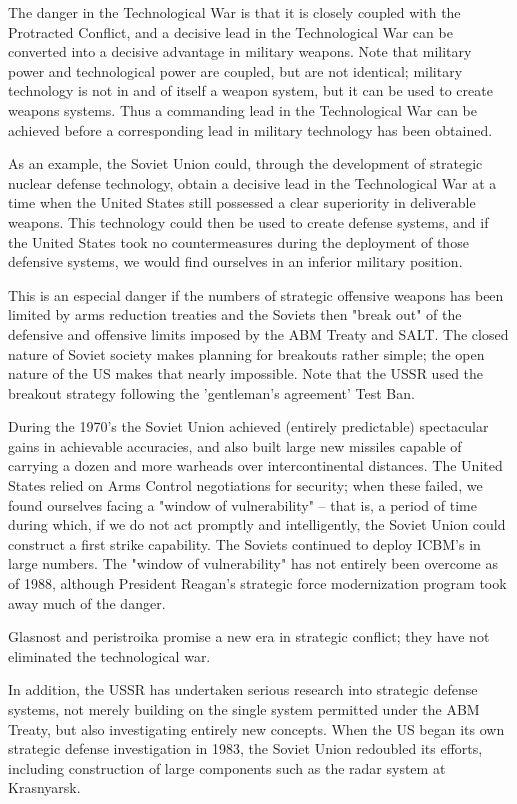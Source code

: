 The danger in the Technological War is that it is closely coupled with the Protracted Conflict, and a decisive lead in the Technological War can be converted into a decisive advantage in military weapons. Note that military power and technological power are coupled, but are not identical; military technology is not in and of itself a weapon system, but it can be used to create weapons systems. Thus a commanding lead in the Technological War can be achieved before a corresponding lead in military technology has been obtained.

As an example, the Soviet Union could, through the development of strategic nuclear defense technology, obtain a decisive lead in the Technological War at a time when the United States still possessed a clear superiority in deliverable weapons. This technology could then be used to create defense systems, and if the United States took no countermeasures during the deployment of those defensive systems, we would find ourselves in an inferior military position.

This is an especial danger if the numbers of strategic offensive weapons has been limited by arms reduction treaties and the Soviets then "break out" of the defensive and offensive limits imposed by the ABM Treaty and SALT. The closed nature of Soviet society makes planning for breakouts rather simple; the open nature of the US makes that nearly impossible. Note that the USSR used the breakout strategy following the 'gentleman's agreement' Test Ban.

During the 1970's the Soviet Union achieved (entirely predictable) spectacular gains in achievable accuracies, and also built large new missiles capable of carrying a dozen and more warheads over intercontinental distances. The United States relied on Arms Control negotiations for security; when these failed, we found ourselves facing a "window of vulnerability" -- that is, a period of time during which, if we do not act promptly and intelligently, the Soviet Union could construct a first strike capability. The Soviets continued to deploy ICBM's in large numbers. The "window of vulnerability" has not entirely been overcome as of 1988, although President Reagan's strategic force modernization program took away much of the danger.

Glasnost and peristroika promise a new era in strategic conflict; they have not eliminated the technological war.

In addition, the USSR has undertaken serious research into strategic defense systems, not merely building on the single system permitted under the ABM Treaty, but also investigating entirely new concepts. When the US began its own strategic defense investigation in 1983, the Soviet Union redoubled its efforts, including construction of large components such as the radar system at Krasnyarsk.

